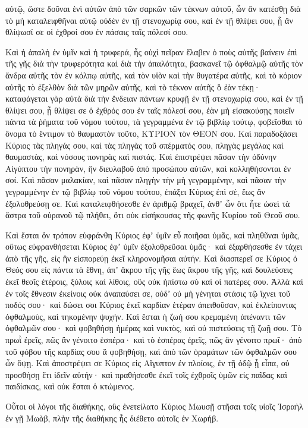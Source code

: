 {αὐτῷ, ὥστε δοῦναι ἑνὶ αὐτῶν ἀπὸ τῶν σαρκῶν τῶν τέκνων αὐτοῦ, ὧν ἂν κατέσθῃ διὰ τὸ μὴ καταλειφθῆναι αὐτῷ οὐδὲν ἐν τῇ στενοχωρίᾳ σου, καὶ ἐν τῇ θλίψει σου, ᾗ ἂν θλίψωσί σε οἱ ἐχθροί σου ἐν πάσαις ταῖς πόλεσί σου.
\par }{\PP {}Καὶ ἡ ἁπαλὴ ἐν ὑμῖν καὶ ἡ τρυφερά, ἧς οὐχὶ πεῖραν ἔλαβεν ὁ ποὺς αὐτῆς βαίνειν ἐπὶ τῆς γῆς διὰ τὴν τρυφερότητα καὶ διὰ τὴν ἁπαλότητα, βασκανεῖ τῷ ὀφθαλμῷ αὐτῆς τὸν ἄνδρα αὐτῆς τὸν ἐν κόλπῳ αὐτῆς, καὶ τὸν υἱὸν καὶ τὴν θυγατέρα αὐτῆς,
καὶ τὸ κόριον αὐτῆς τὸ ἐξελθὸν διὰ τῶν μηρῶν αὐτῆς, καὶ τὸ τέκνον αὐτῆς ὃ ἐὰν τέκῃ· καταφάγεται γὰρ αὐτὰ διὰ τὴν ἔνδειαν πάντων κρυφῇ ἐν τῇ στενοχωρίᾳ σου, καὶ ἐν τῇ θλίψει σου, ᾗ θλίψει σε ὁ ἐχθρός σου ἐν ταῖς πόλεσί σου,
ἐὰν μὴ εἰσακούσῃς ποιεῖν πάντα τὰ ῥήματα τοῦ νόμου τούτου, τὰ γεγραμμένα ἐν τῷ βιβλίῳ τούτῳ, φοβεῖσθαι τὸ ὄνομα τὸ ἔντιμον τὸ θαυμαστὸν τοῦτο, ΚΥΡΙΟΝ τὸν ΘΕΟΝ σου.
Καὶ παραδοξάσει Κύριος τὰς πληγάς σου, καὶ τὰς πληγὰς τοῦ σπέρματός σου, πληγὰς μεγάλας καὶ θαυμαστὰς, καὶ νόσους πονηρὰς καὶ πιστάς.
Καὶ ἐπιστρέψει πᾶσαν τὴν ὀδύνην Αἰγύπτου τὴν πονηρὰν, ἣν διευλαβοῦ ἀπὸ προσώπου αὐτῶν, καὶ κολληθήσονται ἐν σοί.
Καὶ πᾶσαν μαλακίαν, καὶ πᾶσαν πληγὴν τὴν μὴ γεγραμμένην, καὶ πᾶσαν τὴν γεγραμμένην ἐν τῷ βιβλίῳ τοῦ νόμου τούτου, ἐπάξει Κύριος ἐπὶ σέ, ἕως ἂν ἐξολοθρεύσῃ σε.
Καὶ καταλειφθήσεσθε ἐν ἀριθμῷ βραχεῖ, ἀνθʼ ὧν ὅτι ἦτε ὡσεὶ τὰ ἄστρα τοῦ οὐρανοῦ τῷ πλήθει, ὅτι οὐκ εἰσήκουσας τῆς φωνῆς Κυρίου τοῦ Θεοῦ σου.
\par }{\PP {}Καὶ ἔσται ὃν τρόπον εὐφράνθη Κύριος ἐφʼ ὑμῖν εὖ ποιῆσαι ὑμᾶς, καὶ πληθῦναι ὑμᾶς, οὕτως εὐφρανθήσεται Κύριος ἐφʼ ὑμῖν ἐξολοθρεῦσαι ὑμᾶς· καὶ ἐξαρθήσεσθε ἐν τάχει ἀπὸ τῆς γῆς, εἰς ἣν εἰσπορεύῃ ἐκεῖ κληρονομῆσαι αὐτήν.
Καὶ διασπερεῖ σε Κύριος ὁ Θεός σου εἰς πάντα τὰ ἔθνη, ἀπʼ ἄκρου τῆς γῆς ἕως ἄκρου τῆς γῆς, καὶ δουλεύσεις ἐκεῖ θεοῖς ἑτέροις, ξύλοις καὶ λίθοις, οὓς οὐκ ἠπίστω σὺ καὶ οἱ πατέρες σου.
Ἀλλὰ καὶ ἐν τοῖς ἔθνεσιν ἐκείνοις οὐκ ἀναπαύσει σε, οὐδʼ οὐ μὴ γένηται στάσις τῷ ἴχνει τοῦ ποδός σου· καὶ δώσει σοι Κύριος ἐκεῖ καρδίαν ἑτέραν ἀπειθοῦσαν, καὶ ἐκλείποντας ὀφθαλμοὺς, καὶ τηκομένην ψυχήν.
Καὶ ἔσται ἡ ζωή σου κρεμαμένη ἀπέναντι τῶν ὀφθαλμῶν σου· καὶ φοβηθήσῃ ἡμέρας καὶ νυκτὸς, καὶ οὐ πιστεύσεις τῇ ζωῇ σου.
Τὸ πρωῒ ἐρεῖς, πῶς ἂν γένοιτο ἑσπέρα· καὶ τὸ ἑσπέρας ἐρεῖς, πῶς ἂν γένοιτο πρωΐ· ἀπὸ τοῦ φόβου τῆς καρδίας σου ἃ φοβηθήσῃ, καὶ ἀπὸ τῶν ὁραμάτων τῶν ὀφθαλμῶν σου ὧν ὄψῃ.
Καὶ ἀποστρέψει σε Κύριος εἰς Αἴγυπτον ἐν πλοίοις, ἐν τῇ ὁδῷ ᾗ εἶπα, οὐ προσθήσῃ ἔτι ἰδεῖν αὐτήν· καὶ πραθήσεσθε ἐκεῖ τοῖς ἐχθροῖς ὑμῶν εἰς παῖδας καὶ παιδίσκας, καὶ οὐκ ἔσται ὁ κτώμενος.
\par }{\PP {}Οὗτοι οἱ λόγοι τῆς διαθήκης, οὓς ἐνετείλατο Κύριος Μωυσῇ στῆσαι τοῖς υἱοῖς Ἰσραὴλ ἐν γῇ Μωὰβ, πλὴν τῆς διαθήκης ἧς διέθετο αὐτοῖς ἐν Χωρήβ.

}
